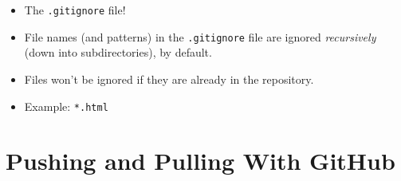 \documentclass[]{book}
\providecommand{\tightlist}{%
  \setlength{\itemsep}{0pt}\setlength{\parskip}{0pt}}
\theoremstyle{definition}
\theoremstyle{definition}
\theoremstyle{remark}
\begin{document}
\begin{itemize}
\tightlist
\item
  The \texttt{.gitignore} file!
\item
  File names (and patterns) in the \texttt{.gitignore} file are ignored
  \emph{recursively} (down into subdirectories), by default.
\item
  Files won't be ignored if they are already in the repository.
\item
  Example: \texttt{*.html}
\end{itemize}

\section{Pushing and Pulling With
GitHub}\label{pushing-and-pulling-with-github}


\end{document}
